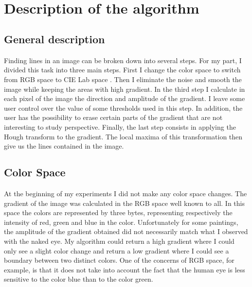 \documentclass[10pt]{article}
\begin{document}
	\section{Description of the algorithm}
	

	\subsection{General description}
	
	\paragraph{}
	Finding lines in an image can be broken down into several steps. For my part, I divided this task into three main steps. First I change the color space to switch from RGB space to CIE Lab space \cite{cielab}. Then I eliminate the noise and smooth the image while keeping the areas with high gradient. In the third step I calculate in each pixel of the image the direction and amplitude of the gradient. I leave some user control over the value of some thresholds used in this step. In addition, the user has the possibility to erase certain parts of the gradient that are not interesting to study perspective. Finally, the last step consists in applying the Hough transform to the gradient. The local maxima of this transformation then give us the lines contained in the image.	
	
	\subsection{Color Space}
	
	\paragraph{}
	At the beginning of my experiments I did not make any color space changes. The gradient of the image was calculated in the RGB space well known to all. In this space the colors are represented by three bytes, representing respectively the intensity of red, green and blue in the color. Unfortunately for some paintings, the amplitude of the gradient obtained did not necessarily match what I observed with the naked eye. My algorithm could return a high gradient where I could only see a slight color change and return a low gradient where I could see a boundary between two distinct colors. One of the concerns of RGB space, for example, is that it does not take into account the fact that the human eye is less sensitive to the color blue than to the color green.
	
\end{document}
